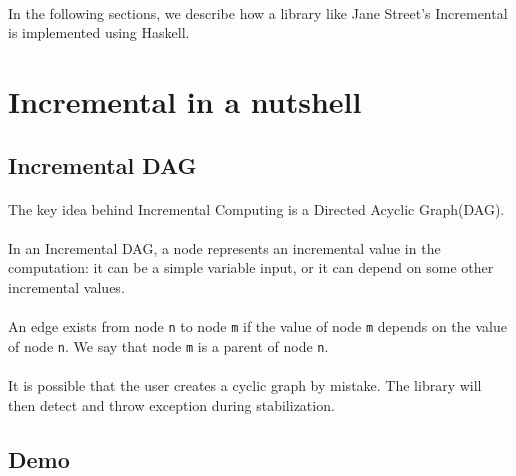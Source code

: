 \documentclass[a4paper, twocolumn]{article}
\begin{document}
\paragraph{} In the following sections, we describe how a library like Jane Street's Incremental is implemented using Haskell.

\section{Incremental in a nutshell }

\subsection{Incremental DAG}
\paragraph{} The key idea behind Incremental Computing is a Directed Acyclic Graph(DAG). 

\paragraph{} In an Incremental DAG, a node represents an incremental value in the computation: it can be a simple variable input, or it can depend on some other incremental values. 

\paragraph{} An edge exists from node \verb|n| to node \verb|m| if the value of node \verb|m| depends on the value of node \verb|n|. We say that node \verb|m| is a parent of node \verb|n|.

\paragraph{} It is possible that the user creates a cyclic graph by mistake. The library will then detect and throw exception during stabilization.



\subsection{Demo}
\end{document}
